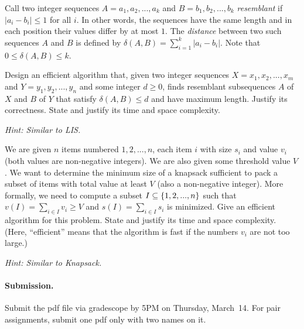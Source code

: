 \documentclass[11pt]{article}
\begin{document}

\begin{problem}
Call two integer sequences $A = a_1,a_2,...,a_k$ and $B = b_1,b_2,...,b_k$ \emph{resemblant}  if $|a_i - b_i| \le 1$ for all $i$. In other words, the sequences have the same length and  in each position their values differ by at most $1$. The \emph{distance} between two such sequences $A$ and $B$ is defined by $\delta(A,B) = \sum_{i=1}^k |a_i - b_i|$. Note that $0 \le \delta(A,B)\le k$.

Design an efficient algorithm that, given two integer sequences $X = x_1,x_2,...,x_m$ and $Y = y_1,y_2,...,y_n$ and some integer $d\ge 0$, 
finds resemblant subsequences $A$ of $X$ and $B$ of $Y$ that satisfy $\delta(A,B) \le d$ 
and have maximum length. Justify its correctness.  State and justify its time and space complexity.  

\noindent\emph{Hint: Similar to LIS.}
\end{problem}



\begin{problem}
We are given $n$ items numbered $1,2,...,n$, 
each item $i$ with size $s_i$ and 
value $v_i$ (both values are non-negative integers).
We are also given some
threshold value $V$. We want to determine the 
minimum size of a knapsack sufficient to pack
a subset of items with total value at least $V$ (also a non-negative
integer).
More formally, we need to compute a subset
$I \subseteq {\left\{ 1,2,...,n \right\} }$ such that
$v(I) = \sum_{i\in I} v_i \ge V$ and
$s(I) = \sum_{i\in I} s_i$ is minimized.
Give an efficient algorithm
for this problem. State and justify its time and space complexity.
(Here, ``efficient'' means that
the algorithm is fast if the numbers $v_i$ are 
not too large.) 

\noindent\emph{Hint: Similar to Knapsack.} 
\end{problem}









\vskip 0.3in
\paragraph{Submission.}
Submit the pdf file via gradescope by 5PM on Thursday, March~14.
For pair assignments, submit one pdf only with two names on it.
\end{document}
